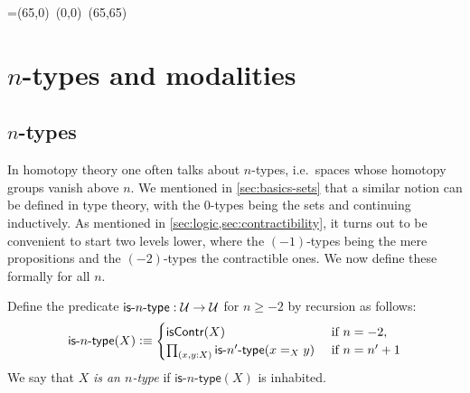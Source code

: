\bgroup %

\newbox\pbbox
\setbox\pbbox=\hbox{\xy \POS(65,0)\ar@{-} (0,0) \ar@{-} (65,65)\endxy}
\def\pb{\save[]+<3.5mm,-3.5mm>*{\copy\pbbox} \restore}

\newcommand{\comp}[2]{\ensuremath{{#2} \circ {#1}}}
\newcommand{\contr}{\ensuremath{\mathsf{contr}}}
\newcommand{\istype}[1]{\mathsf{is}\mbox{-}{#1}\mbox{-}\mathsf{type}}
\newcommand{\nplusone}{\ensuremath{(n+1)}}
\newcommand{\nminusone}{\ensuremath{(n-1)}}

\renewcommand{\P}{\ensuremath{\mathsf{P}}\xspace}
\newcommand{\reflect}{\mathsf{r}}
\newcommand{\project}{\mathsf{p}}
\newcommand{\ext}{\mathsf{ext}}


\chapter{\texorpdfstring{$n$}{n}-types and modalities}
\label{cha:hlevels}

\section{$n$-types}

In homotopy theory one often talks about $n$-types, i.e.\ spaces whose homotopy groups vanish above $n$.
We mentioned in \autoref{sec:basics-sets} that a similar notion can be defined in type theory, with the $0$-types being the sets and continuing inductively.
As mentioned in \autoref{sec:logic,sec:contractibility}, it turns out to be convenient to start two levels lower, where the $(-1)$-types being the mere propositions and the $(-2)$-types the contractible ones.
We now define these formally for all $n$.

\begin{defn}\label{def:hlevel}
  Define the predicate $\istype{n} : \type \to \type$ for $n \geq -2$ by recursion as follows:
  \[ \istype{n}(X) \defeq
  \begin{cases}
    \iscontr(X) & \text{ if } n = -2 , \\
    \prd{x,y : X} \istype{n'}(\id[X]{x}{y}) & \text{ if } n = n'+1
  \end{cases}
  \]
  We say that $X$ \emph{is an $n$-type} if $\istype{n}(X)$ is inhabited.
\end{defn}

